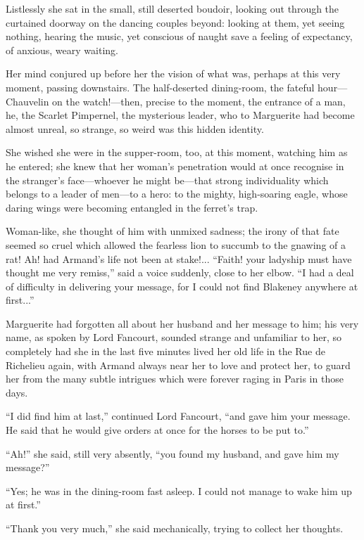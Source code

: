 \documentclass[paper=a5,BCOR=7mm,twoside,DIV=calc,12pt,usegeometry,chapterprefix,endperiod,headings=big]{scrbook}
\begin{document}
Listlessly she sat in the small, still deserted boudoir, looking out through the curtained doorway on the dancing couples beyond: looking at them, yet seeing nothing, hearing the music, yet conscious of naught save a feeling of expectancy, of anxious, weary waiting.

Her mind conjured up before her the vision of what was, perhaps at this very moment, passing downstairs. The half-deserted dining-room, the fateful hour---Chauvelin on the watch!---then, precise to the moment, the entrance of a man, he, the Scarlet Pimpernel, the mysterious leader, who to Marguerite had become almost unreal, so strange, so weird was this hidden identity.

She wished she were in the supper-room, too, at this moment, watching him as he entered; she knew that her woman's penetration would at once recognise in the  stranger's face---whoever he might be---that strong individuality which belongs to a leader of men---to a hero: to the mighty, high-soaring eagle, whose daring wings were becoming entangled in the ferret's trap.

Woman-like, she thought of him with unmixed sadness; the irony of that fate seemed so cruel which allowed the fearless lion to succumb to the gnawing of a rat! Ah! had Armand's life not been at stake!... \enquote{Faith! your ladyship must have thought me very remiss,} said a voice suddenly, close to her elbow. \enquote{I had a deal of difficulty in delivering your message, for I could not find Blakeney anywhere at first...}

Marguerite had forgotten all about her husband and her message to him; his very name, as spoken by Lord Fancourt, sounded strange and unfamiliar to her, so completely had she in the last five minutes lived her old life in the Rue de Richelieu again, with Armand always near her to love and protect her, to guard her from the many subtle intrigues which were forever raging in Paris in those days.

\enquote{I did find him at last,} continued Lord Fancourt, \enquote{and gave him your message. He said that he would give orders at once for the horses to be put to.}

\enquote{Ah!} she said, still very absently, \enquote{you found my husband, and gave him my message?}

\enquote{Yes; he was in the dining-room fast asleep. I could not manage to wake him up at first.}

\enquote{Thank you very much,} she said mechanically, trying to collect her thoughts.
\end{document}
